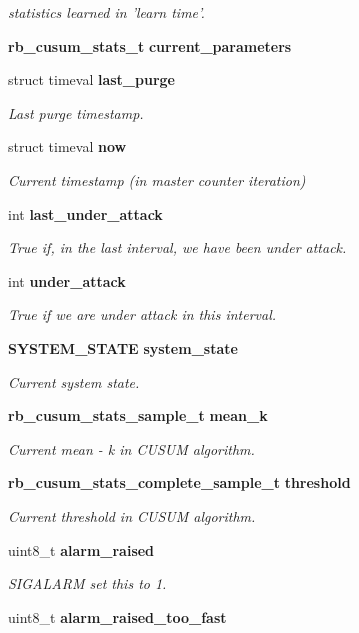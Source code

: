 \begin{DoxyCompactItemize}
\begin{tabbing}
\end{tabbing}\begin{DoxyCompactList}\small\item\em statistics learned in 'learn time'. \end{DoxyCompactList}\item 
{\bf rb\+\_\+cusum\+\_\+stats\+\_\+t} {\bf current\+\_\+parameters}
\item 
struct timeval {\bf last\+\_\+purge}
\begin{DoxyCompactList}\small\item\em Last purge timestamp. \end{DoxyCompactList}\item 
struct timeval {\bf now}
\begin{DoxyCompactList}\small\item\em Current timestamp (in master counter iteration) \end{DoxyCompactList}\item 
int {\bf last\+\_\+under\+\_\+attack}
\begin{DoxyCompactList}\small\item\em True if, in the last interval, we have been under attack. \end{DoxyCompactList}\item 
int {\bf under\+\_\+attack}
\begin{DoxyCompactList}\small\item\em True if we are under attack in this interval. \end{DoxyCompactList}\item 
{\bf S\+Y\+S\+T\+E\+M\+\_\+\+S\+T\+A\+T\+E} {\bf system\+\_\+state}
\begin{DoxyCompactList}\small\item\em Current system state. \end{DoxyCompactList}\item 
{\bf rb\+\_\+cusum\+\_\+stats\+\_\+sample\+\_\+t} {\bf mean\+\_\+k}
\begin{DoxyCompactList}\small\item\em Current mean -\/ k in C\+U\+S\+U\+M algorithm. \end{DoxyCompactList}\item 
{\bf rb\+\_\+cusum\+\_\+stats\+\_\+complete\+\_\+sample\+\_\+t} {\bf threshold}
\begin{DoxyCompactList}\small\item\em Current threshold in C\+U\+S\+U\+M algorithm. \end{DoxyCompactList}\item 
uint8\+\_\+t {\bf alarm\+\_\+raised}
\begin{DoxyCompactList}\small\item\em S\+I\+G\+A\+L\+A\+R\+M set this to 1. \end{DoxyCompactList}\item 
uint8\+\_\+t {\bf alarm\+\_\+raised\+\_\+too\+\_\+fast}
\end{DoxyCompactItemize}


